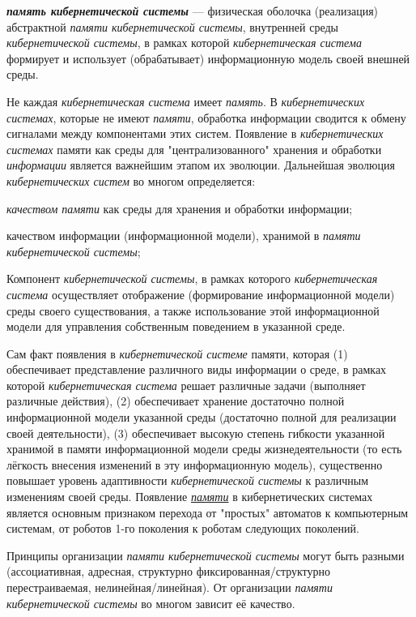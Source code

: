 \textbf{\textit{память кибернетической системы}} --- физическая оболочка (реализация) абстрактной \textit{памяти кибернетической системы}, внутренней среды \textit{кибернетической системы}, в рамках которой \textit{кибернетическая система} формирует и использует (обрабатывает) информационную модель своей внешней среды.

Не каждая \textit{кибернетическая система} имеет \textit{память}. В \textit{кибернетических системах}, которые не имеют \textit{памяти}, обработка информации сводится к обмену сигналами между компонентами этих систем. Появление в \textit{кибернетических системах} памяти как среды для "централизованного"{} хранения и обработки \textit{информации} является важнейшим этапом их эволюции. Дальнейшая эволюция \textit{кибернетических систем} во многом определяется:
\begin{textitemize}
	\item \textit{качеством памяти} как среды для хранения и обработки информации;
	\item качеством информации (информационной модели), хранимой в \textit{памяти кибернетической системы};
\end{textitemize}

Компонент \textit{кибернетической системы}, в рамках которого \textit{кибернетическая система} осуществляет отображение (формирование информационной модели) среды своего существования, а также использование этой информационной модели для управления собственным поведением в указанной среде.

Сам факт появления в \textit{кибернетической системе} памяти, которая (1) обеспечивает представление различного виды информации о среде, в рамках которой \textit{кибернетическая система} решает различные задачи (выполняет различные действия), (2) обеспечивает хранение достаточно полной информационной модели указанной среды (достаточно полной для реализации своей деятельности), (3) обеспечивает высокую степень гибкости указанной хранимой в памяти информационной модели среды жизнедеятельности (то есть лёгкость внесения изменений в эту информационную модель), существенно повышает уровень адаптивности \textit{кибернетической системы} к различным изменениям своей среды.
Появление{} \uline{\textit{памяти}} в кибернетических системах является основным признаком перехода от "простых"{} автоматов к компьютерным системам, от роботов 1-го поколения к роботам следующих поколений.

Принципы организации \textit{памяти кибернетической системы} могут быть разными (ассоциативная, адресная, структурно фиксированная/структурно перестраиваемая, нелинейная/линейная). От организации \textit{памяти кибернетической системы} во многом зависит её качество.

